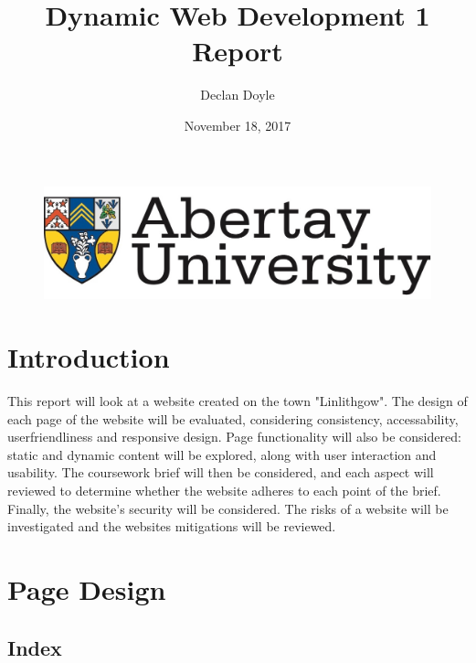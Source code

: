 \documentclass[12pt,a4paper]{article}
\title{Dynamic Web Development 1 Report}
\author{Declan Doyle}
\affil{BSc Ethical Hacking\\
		Abertay University\\
		Dundee, United Kingdom\\
		1600219@abertay.ac.uk}
\date{November 18, 2017}
\begin{document}

	\begin{figure}
		\includegraphics[width=\linewidth]{img/Unilogo}
	\end{figure}


	\maketitle

	\page


	\newpage
	\tableofcontents
	\newpage



	\section{Introduction}
		This report will look at a website created on the town "Linlithgow". The design of each page of the website will be evaluated, considering consistency, accessability, userfriendliness and responsive design.
		Page functionality will also be considered: static and dynamic content will be explored, along with user interaction and usability.
		The coursework brief will then be considered, and each aspect will reviewed to determine whether the website adheres to each point of the brief.
		Finally, the website's security will be considered. The risks of a website will be investigated and the websites mitigations will be reviewed.

	\clearpage
	\section{Page Design}
		\subsection{Index}
\end{document}
